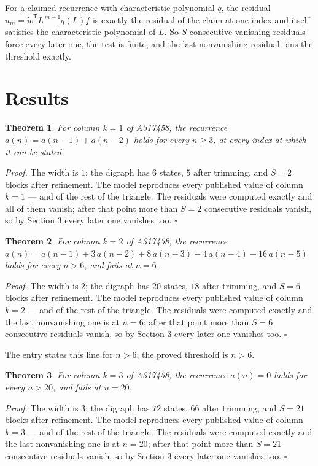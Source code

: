 \documentclass[11pt]{article}
\newtheorem{theorem}{Theorem}
\theoremstyle{definition}
\begin{document}
For a claimed recurrence with characteristic polynomial $q$, the residual $u_m = \tilde w^{\mathsf T}L^{\,m-1}q(L)\tilde f$ is exactly the residual of the claim at one index and itself satisfies the characteristic polynomial of $L$. So $S$ consecutive vanishing residuals force every later one, the test is finite, and the last nonvanishing residual pins the threshold exactly.

\section{Results}

\begin{theorem} For column $k = 1$ of A317458, the recurrence $a(n) = a(n-1) + a(n-2)$ holds for every $n \ge 3$, at every index at which it can be stated.\end{theorem}

{\itshape Proof.} The width is $1$; the digraph has $6$ states, $5$ after trimming, and $S = 2$ blocks after refinement. The model reproduces every published value of column $k = 1$ --- and of the rest of the triangle. The residuals were computed exactly and all of them vanish; after that point more than $S = 2$ consecutive residuals vanish, so by Section 3 every later one vanishes too. $\square$

\begin{theorem} For column $k = 2$ of A317458, the recurrence $a(n) = a(n-1) + 3\,a(n-2) + 8\,a(n-3) - 4\,a(n-4) - 16\,a(n-5)$ holds for every $n > 6$, and fails at $n = 6$.\end{theorem}

{\itshape Proof.} The width is $2$; the digraph has $20$ states, $18$ after trimming, and $S = 6$ blocks after refinement. The model reproduces every published value of column $k = 2$ --- and of the rest of the triangle. The residuals were computed exactly and the last nonvanishing one is at $n = 6$; after that point more than $S = 6$ consecutive residuals vanish, so by Section 3 every later one vanishes too. $\square$

The entry states this line for $n > 6$; the proved threshold is $n > 6$.

\begin{theorem} For column $k = 3$ of A317458, the recurrence $a(n) = 0$ holds for every $n > 20$, and fails at $n = 20$.\end{theorem}

{\itshape Proof.} The width is $3$; the digraph has $72$ states, $66$ after trimming, and $S = 21$ blocks after refinement. The model reproduces every published value of column $k = 3$ --- and of the rest of the triangle. The residuals were computed exactly and the last nonvanishing one is at $n = 20$; after that point more than $S = 21$ consecutive residuals vanish, so by Section 3 every later one vanishes too. $\square$
\end{document}
